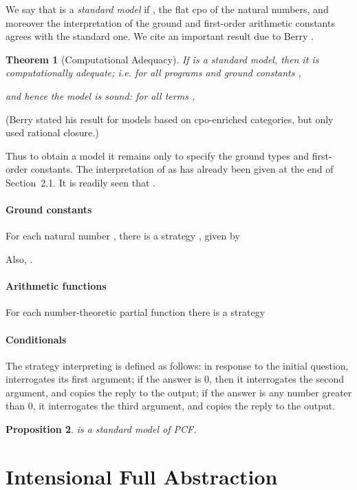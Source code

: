 \documentclass[11pt]{article}
\newtheorem{theorem}{Theorem}[section]
\newtheorem{proposition}[theorem]{Proposition}
\begin{document}
We say that  is a {\em standard model} if , the flat cpo of the
natural numbers, and moreover the interpretation of the ground and
first-order arithmetic constants agrees with the standard one. We
cite an important result due to Berry
\cite{BerryG:modcom,BerryG:fulasl}.

\begin{theorem}[Computational Adequacy]
If  is a standard model, then it is computationally
adequate; {\em i.e.} for all programs  and ground constants ,

and hence the model is {\em sound}: for all terms ,

\end{theorem}
(Berry stated his result for models based on cpo-enriched categories,
but only used rational closure.)

Thus to obtain a model  it remains only to specify the
ground types and first-order constants.
The interpretation of  as  has already been given at the
end of Section~2.1. It is readily seen that .

\paragraph{Ground constants}
For each natural number , there is a strategy , given by

Also, .

\paragraph{Arithmetic functions}
For each number-theoretic partial function 
there is a strategy



\paragraph{Conditionals}
The strategy  interpreting  is defined as follows:
in response to the initial question,  interrogates its first
argument;
if the answer is 0, then it interrogates the second argument, and copies the
reply to the output; if the answer is any number greater than 0, it interrogates
the third argument, and copies the reply to the output.

\begin{proposition}
 is a standard model of PCF.
\end{proposition}

\section{Intensional Full Abstraction}
\newcommand{\Intmod}{\cal M(I)}
\end{document}
